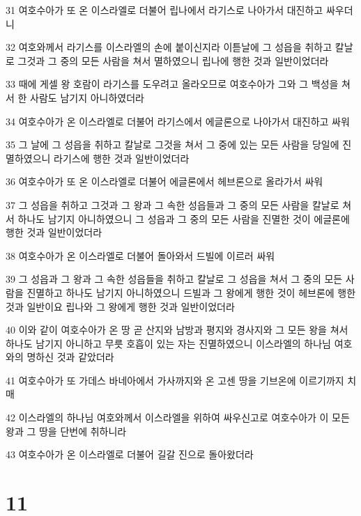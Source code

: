 \par 31 여호수아가 또 온 이스라엘로 더불어 립나에서 라기스로 나아가서 대진하고 싸우더니
\par 32 여호와께서 라기스를 이스라엘의 손에 붙이신지라 이튿날에 그 성읍을 취하고 칼날로 그것과 그 중의 모든 사람을 쳐서 멸하였으니 립나에 행한 것과 일반이었더라
\par 33 때에 게셀 왕 호람이 라기스를 도우려고 올라오므로 여호수아가 그와 그 백성을 쳐서 한 사람도 남기지 아니하였더라
\par 34 여호수아가 온 이스라엘로 더불어 라기스에서 에글론으로 나아가서 대진하고 싸워
\par 35 그 날에 그 성읍을 취하고 칼날로 그것을 쳐서 그 중에 있는 모든 사람을 당일에 진멸하였으니 라기스에 행한 것과 일반이었더라
\par 36 여호수아가 또 온 이스라엘로 더불어 에글론에서 헤브론으로 올라가서 싸워
\par 37 그 성읍을 취하고 그것과 그 왕과 그 속한 성읍들과 그 중의 모든 사람을 칼날로 쳐서 하나도 남기지 아니하였으니 그 성읍과 그 중의 모든 사람을 진멸한 것이 에글론에 행한 것과 일반이었더라
\par 38 여호수아가 온 이스라엘로 더불어 돌아와서 드빌에 이르러 싸워
\par 39 그 성읍과 그 왕과 그 속한 성읍들을 취하고 칼날로 그 성읍을 쳐서 그 중의 모든 사람을 진멸하고 하나도 남기지 아니하였으니 드빌과 그 왕에게 행한 것이 헤브론에 행한 것과 일반이요 립나와 그 왕에게 행한 것과 일반이었더라
\par 40 이와 같이 여호수아가 온 땅 곧 산지와 남방과 평지와 경사지와 그 모든 왕을 쳐서 하나도 남기지 아니하고 무릇 호흡이 있는 자는 진멸하였으니 이스라엘의 하나님 여호와의 명하신 것과 같았더라
\par 41 여호수아가 또 가데스 바네아에서 가사까지와 온 고센 땅을 기브온에 이르기까지 치매
\par 42 이스라엘의 하나님 여호와께서 이스라엘을 위하여 싸우신고로 여호수아가 이 모든 왕과 그 땅을 단번에 취하니라
\par 43 여호수아가 온 이스라엘로 더불어 길갈 진으로 돌아왔더라

\chapter{11}

